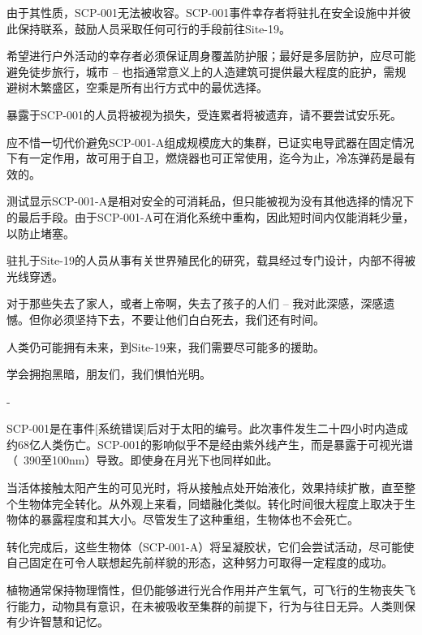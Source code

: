 由于其性质，SCP-001无法被收容。SCP-001事件幸存者将驻扎在安全设施中并彼此保持联系，鼓励人员采取任何可行的手段前往Site-19。

希望进行户外活动的幸存者必须保证周身覆盖防护服；最好是多层防护，应尽可能避免徒步旅行，城市 – 也指通常意义上的人造建筑可提供最大程度的庇护，需规避树木繁盛区，空乘是所有出行方式中的最优选择。

暴露于SCP-001的人员将被视为损失，受连累者将被遗弃，请不要尝试安乐死。

应不惜一切代价避免SCP-001-A组成规模庞大的集群，已证实电导武器在固定情况下有一定作用，故可用于自卫，燃烧器也可正常使用，迄今为止，冷冻弹药是最有效的。

测试显示SCP-001-A是相对安全的可消耗品，但只能被视为没有其他选择的情况下的最后手段。由于SCP-001-A可在消化系统中重构，因此短时间内仅能消耗少量，以防止堵塞。

驻扎于Site-19的人员从事有关世界殖民化的研究，载具经过专门设计，内部不得被光线穿透。

\begin{scpbox}

\begin{scpbox}

对于那些失去了家人，或者上帝啊，失去了孩子的人们 – 我对此深感，深感遗憾。但你必须坚持下去，不要让他们白白死去，我们还有时间。

人类仍可能拥有未来，到Site-19来，我们需要尽可能多的援助。

学会拥抱黑暗，朋友们，我们惧怕光明。

\hr

\hfill - 

\end{scpbox}

\end{scpbox}

SCP-001是在事件[系统错误]后对于太阳的编号。此次事件发生二十四小时内造成约68亿人类伤亡。SCP-001的影响似乎不是经由紫外线产生，而是暴露于可视光谱（~390至100nm）导致。即使身在月光下也同样如此。

当活体接触太阳产生的可见光时，将从接触点处开始液化，效果持续扩散，直至整个生物体完全转化。从外观上来看，同蜡融化类似。转化时间很大程度上取决于生物体的暴露程度和其大小。尽管发生了这种重组，生物体也不会死亡。

转化完成后，这些生物体（SCP-001-A）将呈凝胶状，它们会尝试活动，尽可能使自己固定在可令人联想起先前样貌的形态，这种努力可取得一定程度的成功。

植物通常保持物理惰性，但仍能够进行光合作用并产生氧气，可飞行的生物丧失飞行能力，动物具有意识，在未被吸收至集群的前提下，行为与往日无异。人类则保有少许智慧和记忆。

